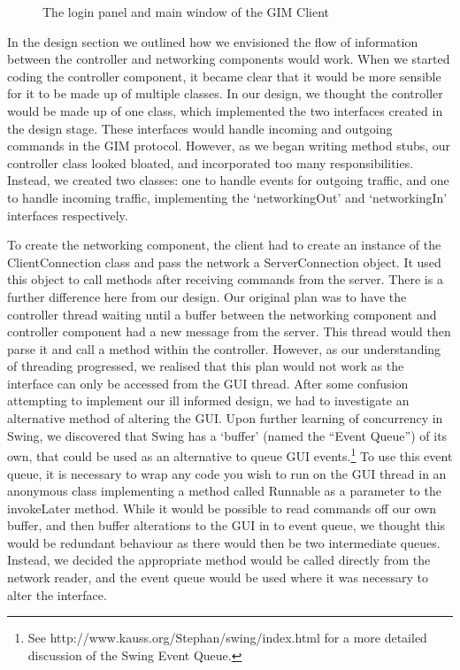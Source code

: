 \begin{figure}
\begin{center}
        \caption{The login panel and main window of the GIM Client}
        \label{MainWindowDia}
    \end{center}
\end{figure}

In the design section we outlined how we envisioned the flow of information between the controller and networking components would work. When we started coding the controller component, it became clear that it would be more sensible for it to be made up of multiple classes. In our design, we thought the controller would be made up of one class, which implemented the two interfaces created in the design stage. These interfaces would handle incoming and outgoing commands in the GIM protocol. However, as we began writing method stubs, our controller class looked bloated, and incorporated too many responsibilities. Instead, we created two classes: one to handle events for outgoing traffic, and one to handle incoming traffic, implementing the `networkingOut' and `networkingIn' interfaces respectively.

To create the networking component, the client had to create an instance of the ClientConnection class and pass the network a ServerConnection object. It used this object to call methods after receiving commands from the server. There is a further difference here from our design. Our original plan was to have the controller thread waiting until a buffer between the networking component and controller component had a new message from the server. This thread would then parse it and call a method within the controller. However, as our understanding of threading progressed, we realised that this plan would not work as the interface can only be accessed from the GUI thread. After some confusion attempting to implement our ill informed design, we had to investigate an alternative method of altering the GUI. Upon further learning of concurrency in Swing, we discovered that Swing has a `buffer' (named the ``Event Queue'') of its own, that could be used as an alternative to queue GUI events.\footnote{See http://www.kauss.org/Stephan/swing/index.html for a more detailed discussion of the Swing Event Queue.} To use this event queue, it is necessary to wrap any code you wish to run on the GUI thread in an anonymous class implementing a method called Runnable as a parameter to the invokeLater method.  While it would be possible to read commands off our own buffer, and then buffer alterations to the GUI in to event queue, we thought this would be redundant behaviour as there would then be two intermediate queues. Instead, we decided the appropriate method would be called directly from the network reader, and the event queue would be used where it was necessary to alter the interface.

